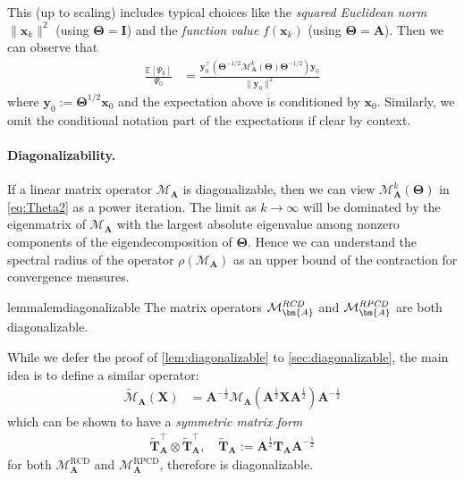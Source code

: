 \documentclass{article}
\theoremstyle{plain}
\theoremstyle{definition}
\theoremstyle{remark}
\def\norm#1{\lVert#1\rVert}
\def\bigopen#1{\left(#1\right)}
\def\bigclosed#1{\left[#1\right]}
\newcommand{\mTheta}{\bm{\Theta}}
\newcommand{\RCD}{\text{RCD}} %
\newcommand{\RPCD}{\text{RPCD}} %
\newcommand{\MARCD}{\mathcal{M}_{\bm{A}}^{\RCD}} %
\newcommand{\MARPCD}{\mathcal{M}_{\bm{A}}^{\RPCD}} %
\def\vx{{\bm{x}}}
\def\vy{{\bm{y}}}
\def\mA{{\bm{A}}}
\def\mI{{\bm{I}}}
\def\mT{{\bm{T}}}
\def\mX{{\bm{X}}}
\def\gM{{\mathcal{M}}}
\newcommand{\E}{\mathbb{E}}
\begin{document}
This (up to scaling) includes typical choices like the \emph{squared Euclidean norm} $\norm{\vx_{k}}^{2}$ (using $\mTheta = \mI$) and the \emph{function value} $f(\vx_{k})$ (using $\mTheta = \mA$).
Then we can observe that
\begin{align}
    \frac{\E \bigclosed{\Psi_{k}}}{\Psi_{0}} &= \frac{\vy_{0}^{\top} \bigopen{\mTheta^{-1/2} \gM_{\mA}^{k}(\mTheta) \mTheta^{-1/2}} \vy_{0}}{\norm{\vy_{0}}^2}
    \label{eq:Theta2}
\end{align}
where $\vy_{0} := \mTheta^{1/2} \vx_{0}$ and the expectation above is conditioned by $\vx_0$.
Similarly, we omit the conditional notation part of the expectations if clear by context.


\paragraph{Diagonalizability.}
If a linear matrix operator $\gM_{\mA}$ is diagonalizable, then we can view $\gM_{\mA}^{k} (\mTheta)$ in \eqref{eq:Theta2} as a power iteration. 
The limit as $k \rightarrow \infty$ will be dominated by the eigenmatrix of $\gM_{\mA}$ with the largest absolute eigenvalue among nonzero components of the eigendecomposition of $\mTheta$.
Hence we can understand the spectral radius of the operator $\rho (\gM_{\mA})$ as an upper bound of the contraction for convergence measures.

\begin{restatable}{lemma}{lemdiagonalizable}
    \label{lem:diagonalizable}
    The matrix operators $\gM_{\mA}^{\emph{RCD}}$ and $\gM_{\mA}^{\emph{RPCD}}$ are both diagonalizable.
\end{restatable}

While we defer the proof of \cref{lem:diagonalizable} to \cref{sec:diagonalizable},
the main idea is to define a similar operator:
\begin{align}
    \widetilde{\gM}_{\mA} (\mX) &= \mA^{-\frac12} \gM_{\mA} (\mA^{\frac12} \mX \mA^{\frac12}) \mA^{-\frac12}
    \label{eq:similaroperator}
\end{align}
which can be shown to have a \textit{symmetric matrix form}
\begin{align}
    \widetilde{\mT}_{\mA}^{\top} \otimes \widetilde{\mT}_{\mA}^{\top}, \quad \widetilde{\mT}_{\mA} := \mA^{\frac12} \mT_{\mA} \mA^{-\frac12}
    \label{eq:ttilde}
\end{align}
for both $\MARCD$ and $\MARPCD$, therefore is diagonalizable.
\end{document}
